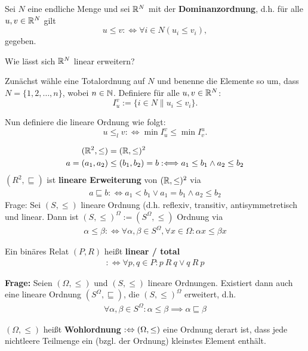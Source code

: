 \begin{aufgabe}
    Sei $N$ eine endliche Menge und 
    sei $\mathbb{R}^N$ mit der \textbf{Dominanzordnung}, d.h. für alle $u,v \in \mathbb{R}^N$ gilt
    $$u \leq v :\iff \forall i \in N (u_i \leq v_i),$$
    gegeben.
    
    Wie lässt sich $\mathbb{R}^N$ linear erweitern?
\end{aufgabe}
\begin{lösung}
    Zunächst wähle eine Totalordnung auf $ N $ und benenne die Elemente so um, dass
    $N = \{1,2,\ldots,n\}$, wobei $n \in \mathbb{N}$.
    Definiere für alle $u,v \in \mathbb{R}^N$:
    $$ I^v_u := \{i \in N \| u_i \leq v_i\}.$$

    Nun definiere die lineare Ordnung wie folgt:
    $$ u \leq_l v :\iff \min I^v_u \leq \min I^u_v.$$
\end{lösung}

\begin{beispiel}
\begin{align*}
(\mathbb{R}^2,\leq)&=(\mathbb{R},\leq)^2\\
a=(a_1,a_2)&\leq(b_1,b_2)=b:\Longleftrightarrow a_1\leq b_1\wedge a_2\leq b_2
\end{align*}
$(R^2,\sqsubseteq)$ ist \textbf{lineare Erweiterung} von $(\mathbb{R},\leq)^2$ via 
\begin{align*}
a\sqsubseteq b:\Longleftrightarrow a_1<b_1\vee a_1=b_1\wedge a_2\leq b_2
\end{align*}
Frage: Sei $(S,\leq)$ lineare Ordnung (d.h. reflexiv, transitiv, antisymmetretisch und linear. Dann ist $(S,\leq)^\Omega:=(S^\Omega,\leq)$ Ordnung via
\begin{align*}
\alpha\leq\beta:\Longleftrightarrow\forall\alpha,\beta\in S^\Omega,\forall x\in\Omega:\alpha x\leq\beta x
\end{align*}
\end{beispiel}

\begin{definition}
Ein binäres Relat $(P,R)$ heißt \textbf{linear / total}
\begin{align*}
:\Longleftrightarrow\forall p,q\in P:p~R~q\vee q~R~p
\end{align*}
\end{definition}
\textbf{Frage:} Seien $(\Omega,\leq)$ und $(S,\leq)$ lineare Ordnungen. Existiert dann auch eine lineare Ordnung $(S^\Omega,\sqsubseteq)$, die $(S,\leq)^\Omega$ erweitert, d.h.
\begin{align*}
\forall\alpha,\beta\in S^\Omega:\alpha\leq\beta\implies\alpha\sqsubseteq\beta
\end{align*}
\begin{definition}
$(\Omega,\leq)$ heißt \textbf{Wohlordnung} $:\Leftrightarrow(\Omega,\leq)$ eine Ordnung derart ist, dass jede nichtleere Teilmenge ein (bzgl. der Ordnung) kleinstes Element enthält.
\end{definition}

